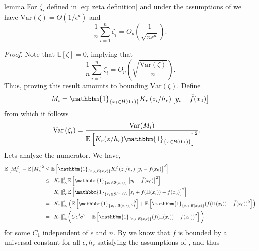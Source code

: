\documentclass[11pt]{article}
\begin{document}
\begin{restatable}{lemma}{} \label{lemma: zeta}
    For $\zeta_i$ defined in \cref{eq: zeta definition} and under the assumptions of  we have $\text{Var}(\zeta) = \Theta(1/\epsilon^d)$ and 
    \begin{equation*}
        \frac{1}{n}\sum_{i = 1}^n\zeta_i = O_p\left(\frac{1}{\sqrt{n\epsilon^d}}\right).
    \end{equation*}
\end{restatable}
\noindent \textit{Proof.} Note that $\mathbb{E}[\zeta] = 0$, implying that
\[\frac{1}{n}\sum_{i = 1}^n\zeta_i = O_p\left(\sqrt{\frac{\text{Var}(\zeta)}{n}}\right).\]
Thus, proving this result amounts to bounding $\text{Var}(\zeta)$. Define 
\begin{equation*}
    M_i = \mathbbm{1}_{\{x_i \in \mathcal{B}(0, \epsilon)\}}K_r\left(z_i/h_r \right)\left[y_i - \bar{f}(x_0)\right]
\end{equation*}
from which it follows
\begin{align}
    \text{Var}\left(\zeta_i\right)  &= \frac{\text{Var}(M_i)}{\mathbb{E}\left[K_r(z/h_r)\mathbbm{1}_{\{x\in \mathcal{B}(0, \epsilon)\}}\right]^2}. \label{eq: var decomp}
\end{align}
Lets analyze the numerator. We have,
\begin{align*}
    \mathbb{E}\left[M_i^2\right] - \mathbb{E}\left[M_i\right]^2 &\leq \mathbb{E}\left[\mathbbm{1}_{\{x_i \in \mathcal{B}(x, \epsilon)\}}K_r^2\left(z_i/h_r\right)\left[y_i - \bar{f}(x_0)\right]^2\right]  \\
    &\leq \|K_r\|_{\infty}^2\mathbb{E}\left[\mathbbm{1}_{\{x_i \in \mathcal{B}(x, \epsilon)\}}\left[y_i - \bar{f}(x_0)\right]^2\right] \\
    &= \|K_r\|_{\infty}^2\mathbb{E}\left[\mathbbm{1}_{\{x_i \in \mathcal{B}(x, \epsilon)\}}\left[\varepsilon_i + f(\Pi(x_i)) - \bar{f}(x_0)\right]^2\right] \\
    &= \|K_r\|_{\infty}^2\left(\mathbb{E}\left[\mathbbm{1}_{\{x_i \in \mathcal{B}(x, \epsilon)\}}\varepsilon_i^2 \right] + \mathbb{E}\left[\mathbbm{1}_{\{x_i \in \mathcal{B}(x, \epsilon)\}}(f(\Pi(x_i)) - \bar{f}(x_0))^2 \right]\right) \\
    &= \|K_r\|^2_{\infty}\bigg(C\epsilon^d\sigma^2+ \mathbb{E}\left[\mathbbm{1}_{\{x_i \in \mathcal{B}(x, \epsilon)\}}(f(\Pi(x_i)) - \bar{f}(x_0))^2 \right]\bigg)
\end{align*}
for some $C_1$ independent of $\epsilon$ and $n$. By  we know that $\bar{f}$ is bounded by a universal constant for all $\epsilon, h_r$ satisfying the assumptions of , and thus
\end{document}
